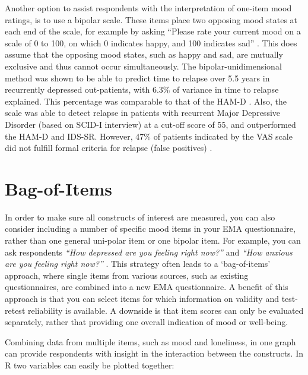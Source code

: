 \documentclass[]{book}
\begin{document}
Another option to assist respondents with the interpretation of one-item
mood ratings, is to use a bipolar scale. These items place two opposing
mood states at each end of the scale, for example by asking ``Please
rate your current mood on a scale of 0 to 100, on which 0 indicates
happy, and 100 indicates sad'' \citep{Vanrijsbergen2014}. This does
assume that the opposing mood states, such as happy and sad, are
mutually exclusive and thus cannot occur simultaneously. The
bipolar-unidimensional method was shown to be able to predict time to
relapse over 5.5 years in recurrently depressed out-patients, with 6.3\%
of variance in time to relapse explained. This percentage was comparable
to that of the HAM-D \citep{Rijsbergen2012}. Also, the scale was able to
detect relapse in patients with recurrent Major Depressive Disorder
(based on SCID-I interview) at a cut-off score of 55, and outperformed
the HAM-D and IDS-SR. However, 47\% of patients indicated by the VAS
scale did not fulfill formal criteria for relapse (false positives)
\citep{Vanrijsbergen2014}.

\section{Bag-of-Items}\label{bag-of-items}


In order to make sure all constructs of interest are measured, you can
also consider including a number of specific mood items in your EMA
questionnaire, rather than one general uni-polar item or one bipolar
item. For example, you can ask respondents \emph{``How depressed are you
feeling right now?''} and \emph{``How anxious are you feeling right
now?''} \citep{Starr2012}. This strategy often leads to a `bag-of-items'
approach, where single items from various sources, such as existing
questionnaires, are combined into a new EMA questionnaire. A benefit of
this approach is that you can select items for which information on
validity and test-retest reliability is available. A downside is that
item scores can only be evaluated separately, rather that providing one
overall indication of mood or well-being.

Combining data from multiple items, such as mood and loneliness, in one
graph can provide respondents with insight in the interaction between
the constructs. In R two variables can easily be plotted together:
\end{document}
